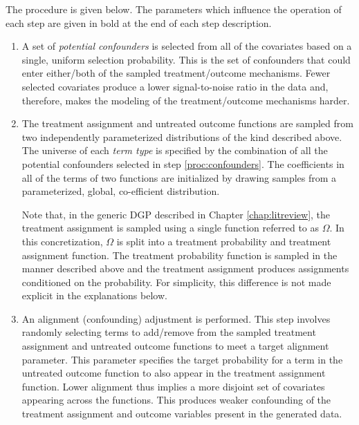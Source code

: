 \documentclass[../main.tex]{subfiles}
\begin{document}
\vspace{\baselineskip}

The procedure is given below. The parameters which influence the operation of each step are given in bold at the end of each step description.

\begin{enumerate}
    \item A set of \textit{potential confounders} is selected from all of the covariates based on a single, uniform selection probability. This is the set of confounders that could enter either/both of the sampled treatment/outcome mechanisms. Fewer selected covariates produce a lower signal-to-noise ratio in the data and, therefore, makes the modeling of the treatment/outcome mechanisms harder. \label{proc:confounders}

    \item The treatment assignment and untreated outcome functions are sampled from two independently parameterized distributions of the kind described above. The universe of each \textit{term type} is specified by the combination of all the potential confounders selected in step \ref{proc:confounders}. The coefficients in all of the terms of two functions are initialized by drawing samples from a parameterized, global, co-efficient distribution.

    \vspace{\baselineskip}

    Note that, in the generic DGP described in Chapter \ref{chap:litreview}, the treatment assignment is sampled using a single function referred to as $\Omega$. In this concretization, $\Omega$ is split into a treatment probability and treatment assignment function. The treatment probability function is sampled in the manner described above and the treatment assignment produces assignments conditioned on the probability. For simplicity, this difference is not made explicit in the explanations below.

    \item An alignment (confounding) adjustment is performed. This step involves randomly selecting terms to add/remove from the sampled treatment assignment and untreated outcome functions to meet a target alignment parameter. This parameter specifies the target probability for a term in the untreated outcome function to also appear in the treatment assignment function. Lower alignment thus implies a more disjoint set of covariates appearing across the functions. This produces weaker confounding of the treatment assignment and outcome variables present in the generated data.


\end{enumerate}
\end{document}
